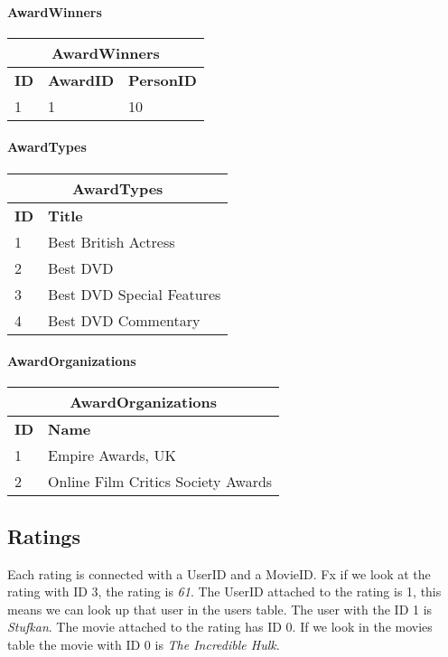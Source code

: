 \paragraph{AwardWinners}

\begin{center}
\begin{tabular}{|l|l|l|}
\hline
\multicolumn{3}{|c|}{AwardWinners} \\ \hline \hline
\textbf{ID} & \textbf{AwardID} & \textbf{PersonID} \\ \hline \hline
1 & 1 & 10 \\ \hline
\end{tabular}
\end{center}

\paragraph{AwardTypes}

\begin{center}
\begin{tabular}{|l|l|}
\hline
\multicolumn{2}{|c|}{AwardTypes} \\ \hline \hline
\textbf{ID} & \textbf{Title} \\ \hline \hline
1 & Best British Actress \\ \hline
2 & Best DVD \\ \hline
3 & Best DVD Special Features \\ \hline
4 & Best DVD Commentary \\ \hline
\end{tabular}
\end{center}

\paragraph{AwardOrganizations}

\begin{center}
\begin{tabular}{|l|l|}
\hline
\multicolumn{2}{|c|}{AwardOrganizations} \\ \hline \hline
\textbf{ID} & \textbf{Name} \\ \hline \hline
1 & Empire Awards, UK \\ \hline
2 & Online Film Critics Society Awards \\ \hline
\end{tabular}
\end{center}

\subsection{Ratings}
Each rating is connected with a UserID and a MovieID.
Fx if we look at the rating with ID 3, the rating is \textit{61}.
The UserID attached to the rating is 1, this means we can look up that user in the users table.
The user with the ID 1 is \textit{Stufkan}.
The movie attached to the rating has ID 0.
If we look in the movies table the movie with ID 0 is \textit{The Incredible Hulk}.
